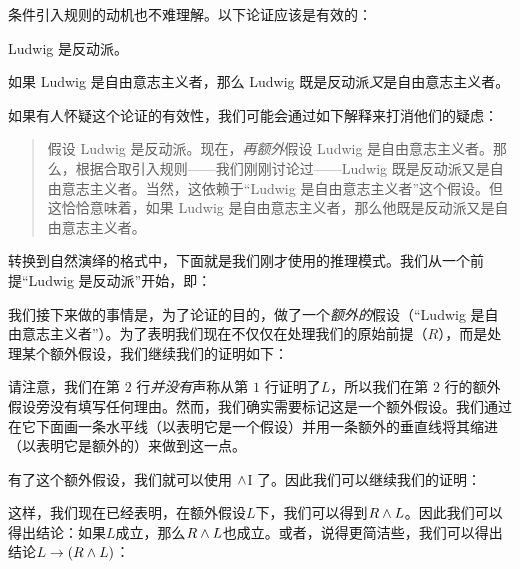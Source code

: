 条件引入规则的动机也不难理解。以下论证应该是有效的：


\begin{earg}
        \item Ludwig 是反动派。
        \item[\texttherefore] 如果 Ludwig 是自由意志主义者，那么 Ludwig 既是反动派\emph{又}是自由意志主义者。
    \end{earg}


如果有人怀疑这个论证的有效性，我们可能会通过如下解释来打消他们的疑虑：


\begin{quote}
        假设 Ludwig 是反动派。现在，\emph{再额外}假设 Ludwig 是自由意志主义者。那么，根据合取引入规则——我们刚刚讨论过——Ludwig 既是反动派又是自由意志主义者。当然，这依赖于“Ludwig 是自由意志主义者”这个假设。但这恰恰意味着，如果 Ludwig 是自由意志主义者，那么他既是反动派又是自由意志主义者。
    \end{quote}


转换到自然演绎的格式中，下面就是我们刚才使用的推理模式。我们从一个前提“Ludwig 是反动派”开始，即：


\begin{fitchproof}
        \PR
    \end{fitchproof}


我们接下来做的事情是，为了论证的目的，做了一个\emph{额外的}假设（“Ludwig 是自由意志主义者”）。为了表明我们现在不仅仅在处理我们的原始前提（$R$），而是处理某个额外假设，我们继续我们的证明如下：


\begin{fitchproof}
        \PR
        \open
            \AS
    \end{fitchproof}


请注意，我们在第 $2$ 行\emph{并没有}声称从第 $1$ 行证明了$L$，所以我们在第 $2$ 行的额外假设旁没有填写任何理由。然而，我们确实需要标记这是一个额外假设。我们通过在它下面画一条水平线（以表明它是一个假设）并用一条额外的垂直线将其缩进（以表明它是额外的）来做到这一点。

有了这个额外假设，我们就可以使用 $\wedge$I 了。因此我们可以继续我们的证明：


\begin{fitchproof}
        \PR
        \open
            \AS
    \end{fitchproof}


这样，我们现在已经表明，在额外假设$L$下，我们可以得到$R \wedge L$。因此我们可以得出结论：如果$L$成立，那么$R \wedge L$也成立。或者，说得更简洁些，我们可以得出结论$L \rightarrow (R \wedge L)$：


